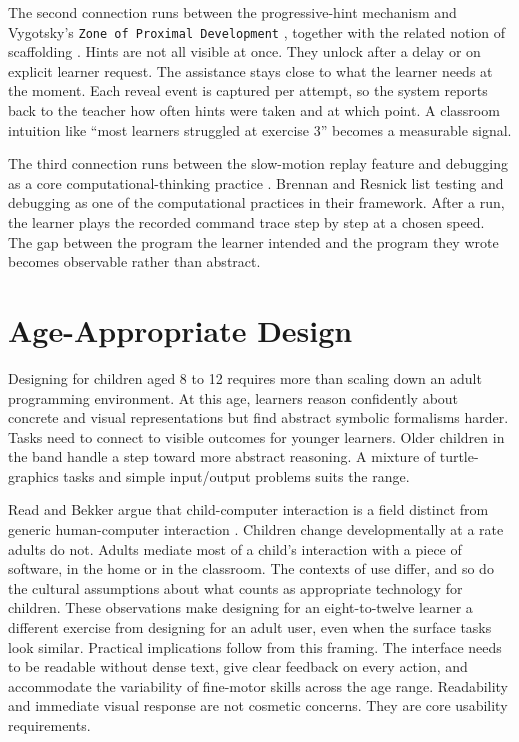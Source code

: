 The second connection runs between the progressive-hint mechanism and
Vygotsky's \texttt{Zone of Proximal Development} \cite{Vygotsky1980},
together with the related notion of scaffolding \cite{bruner1976}.
Hints are not all visible at once. They unlock after a delay or on
explicit learner request. The assistance stays close to what the
learner needs at the moment. Each reveal event is captured per
attempt, so the system reports back to the teacher how often hints
were taken and at which point. A classroom intuition like ``most
learners struggled at exercise 3'' becomes a measurable signal.

The third connection runs between the slow-motion replay feature and
debugging as a core computational-thinking practice
\cite{brennan2012}. Brennan and Resnick list testing and debugging
as one of the computational practices in their framework. After a
run, the learner plays the recorded command trace step by step at a
chosen speed. The gap between the program the learner intended and
the program they wrote becomes observable rather than abstract.

\section{Age-Appropriate Design}
\label{sec:design-age}

Designing for children aged 8 to 12 requires more than scaling down
an adult programming environment. At this age, learners reason
confidently about concrete and visual representations but find
abstract symbolic formalisms harder. Tasks need to connect to
visible outcomes for younger learners. Older children in the band
handle a step toward more abstract reasoning. A mixture of
turtle-graphics tasks and simple input/output problems suits the
range.

Read and Bekker argue that child-computer interaction is a field
distinct from generic human-computer interaction
\cite{read2008}. Children change developmentally at a rate adults do
not. Adults mediate most of a child's interaction with a piece of
software, in the home or in the classroom. The contexts of use
differ, and so do the cultural assumptions about what counts as
appropriate technology for children. These observations make
designing for an eight-to-twelve learner a different exercise from
designing for an adult user, even when the surface tasks look
similar. Practical implications follow from this framing. The
interface needs to be readable without dense text, give clear
feedback on every action, and accommodate the variability of
fine-motor skills across the age range. Readability and immediate
visual response are not cosmetic concerns. They are core usability
requirements.


